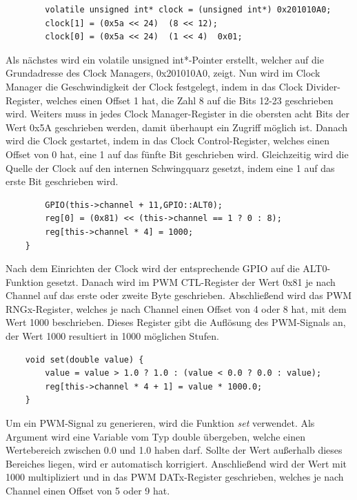 \documentclass[12pt]{article}
\begin{document}
\begin{verbatim}        
        volatile unsigned int* clock = (unsigned int*) 0x201010A0;
        clock[1] = (0x5a << 24)  (8 << 12);
        clock[0] = (0x5a << 24)  (1 << 4)  0x01;
\end{verbatim}   
\vspace{-2mm}
Als nächstes wird ein volatile unsigned int*-Pointer erstellt, welcher auf die Grundadresse des Clock Managers, 0x201010A0, zeigt. Nun wird im Clock Manager die Geschwindigkeit der Clock festgelegt, indem in das Clock Divider-Register, welches einen Offset 1 hat, die Zahl 8 auf die Bits 12-23 geschrieben wird. Weiters muss in jedes Clock Manager-Register in die obersten acht Bits der Wert 0x5A geschrieben werden, damit überhaupt ein Zugriff möglich ist. Danach wird die Clock gestartet, indem in das Clock Control-Register, welches einen Offset von 0 hat, eine 1 auf das fünfte Bit geschrieben wird. Gleichzeitig wird die Quelle der Clock auf den internen Schwingquarz gesetzt, indem eine 1 auf das erste Bit geschrieben wird.\\
\begin{verbatim}
        GPIO(this->channel + 11,GPIO::ALT0);
        reg[0] = (0x81) << (this->channel == 1 ? 0 : 8);
        reg[this->channel * 4] = 1000;
    } 
\end{verbatim}
\vspace{-2mm}
Nach dem Einrichten der Clock wird der entsprechende GPIO auf die ALT0-Funktion gesetzt. Danach wird im PWM CTL-Register der Wert 0x81 je nach Channel auf das erste oder zweite Byte geschrieben. Abschließend wird das PWM RNGx-Register, welches je nach Channel einen Offset von 4 oder 8 hat, mit dem Wert 1000 beschrieben. Dieses Register gibt die Auflösung des PWM-Signals an, der Wert 1000 resultiert in 1000 möglichen Stufen.\\
\begin{verbatim}
    void set(double value) {
        value = value > 1.0 ? 1.0 : (value < 0.0 ? 0.0 : value);
        reg[this->channel * 4 + 1] = value * 1000.0;  
    }
\end{verbatim}
\vspace{-2mm}
Um ein PWM-Signal zu generieren, wird die Funktion \textit{set} verwendet. Als Argument wird eine Variable vom Typ double übergeben, welche einen Wertebereich zwischen 0.0 und 1.0 haben darf. Sollte der Wert außerhalb dieses Bereiches liegen, wird er automatisch korrigiert. Anschließend wird der Wert mit 1000 multipliziert und in das PWM DATx-Register geschrieben, welches je nach Channel einen Offset von 5 oder 9 hat.
\end{document}
